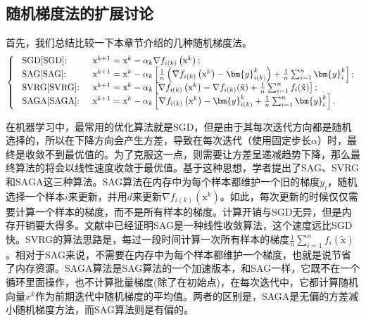 \subsection{随机梯度法的扩展讨论}
首先，我们总结比较一下本章节介绍的几种随机梯度法。
\begin{equation}
    \left\{\begin{array}{ll}
    \text { SGD\cite{SGD}: } & \mathrm{x}^{k+1}=\mathrm{x}^{k}-\alpha_{k} \nabla f_{i(k)}\left(\mathrm{x}^{k}\right) ;\\
    \text { SAG\cite{SAG}: } & \mathrm{x}^{k+1}=\mathrm{x}^{k}-\alpha_{k}\left[\frac{1}{n}\left(\nabla f_{i(k)}\left(\mathrm{x}^{k}\right)-\bm{y}_{i(k)}^{k}\right)+\frac{1}{n} \sum_{i=1}^{n} \bm{y}_{i}^{k}\right] ;\\
    \text { SVRG\cite{SVRG}: } & \mathrm{x}^{k+1}=\mathrm{x}^{k}-\alpha_{k}\left[\nabla f_{i(k)}\left(\mathrm{x}^{k}\right)-\nabla f_{i(k)}(\tilde{\mathrm{x}})+\frac{1}{n} \sum_{i=1}^{n} f_{i}(\tilde{\mathrm{x}})\right] ;\\
    \text { SAGA\cite{SAGA}: } & \mathrm{x}^{k+1}=\mathrm{x}^{k}-\alpha_{k}\left[\nabla f_{i(k)}\left(\mathrm{x}^{k}\right)-\bm{y}_{i(k)}^{k}+\frac{1}{n} \sum_{i=1}^{n} \bm{y}_{i}^{k}\right] .
    \end{array}\right.
\end{equation}
\par 在机器学习中，最常用的优化算法就是SGD\cite{SGD}，但是由于其每次迭代方向都是随机选择的，所以在下降方向会产生方差，导致在每次迭代（使用固定步长$\alpha$）时，最终是收敛不到最优值的。为了克服这一点，则需要让方差呈递减趋势下降，那么最终算法的将会以线性速度收敛于最优值。基于这种思想，学者提出了SAG\cite{SAG}、SVRG\cite{SVRG}和SAGA\cite{SAGA}这三种算法。SAG算法\cite{SAG}在内存中为每个样本都维护一个旧的梯度$y_i$，随机选择一个样本$i$来更新，并用$d$来更新$\nabla f_{i(k)}\left(\mathrm{x}^{k}\right)$。如此，每次更新的时候仅仅需要计算一个样本的梯度，而不是所有样本的梯度。计算开销与SGD\cite{SGD}无异，但是内存开销要大得多。文献\cite{SAG}中已经证明SAG\cite{SAG}是一种线性收敛算法，这个速度远比SGD\cite{SGD}快。SVRG\cite{SVRG}的算法思路是，每过一段时间计算一次所有样本的梯度$\frac{1}{n} \sum_{i=1}^{n} f_{i}(\tilde{\mathrm{x}})$。相对于SAG\cite{SAG}来说，不需要在内存中为每个样本都维护一个梯度，也就是说节省了内存资源。SAGA算法\cite{SAGA}是SAG\cite{SAG}算法的一个加速版本，和SAG\cite{SAGA}一样，它既不在一个循环里面操作，也不计算批量梯度(除了在初始点)，在每次迭代中，它都计算随机向量$x^k$作为前期迭代中随机梯度的平均值。两者的区别是，SAGA\cite{SAGA}是无偏的方差减小随机梯度方法，而SAG算法\cite{SAG}则是有偏的。

